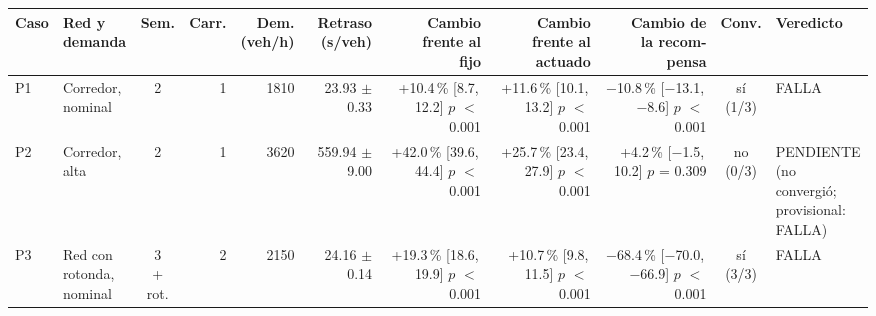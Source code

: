 \begin{table}[H]
\centering
\scriptsize
\setlength{\tabcolsep}{1.5pt}
\begin{tabular}{llcrrrrrrcl}
\toprule
Caso & \makecell[l]{Red y\\demanda} & Sem. & Carr. & \makecell{Dem.\\(veh/h)} & \makecell{Retraso\\(s/veh)} & \makecell{Cambio\\frente al\\fijo} & \makecell{Cambio\\frente al\\actuado} & \makecell{Cambio de\\la recom-\\pensa} & Conv. & Veredicto \\
\midrule
P1 & \makecell[l]{Corredor,\\{}nominal} & 2 & 1 & 1810 & \makecell[r]{23.93\\{}$\pm$ 0.33} & \makecell[r]{+10.4\,\%\\{}[8.7,\,12.2]\\$p$ $<$\,0.001} & \makecell[r]{+11.6\,\%\\{}[10.1,\,13.2]\\$p$ $<$\,0.001} & \makecell[r]{$-$10.8\,\%\\{}[$-$13.1,\,$-$8.6]\\$p$ $<$\,0.001} & \makecell[c]{sí\\{}(1/3)} & FALLA \\
P2 & \makecell[l]{Corredor,\\{}alta} & 2 & 1 & 3620 & \makecell[r]{559.94\\{}$\pm$ 9.00} & \makecell[r]{+42.0\,\%\\{}[39.6,\,44.4]\\$p$ $<$\,0.001} & \makecell[r]{+25.7\,\%\\{}[23.4,\,27.9]\\$p$ $<$\,0.001} & \makecell[r]{+4.2\,\%\\{}[$-$1.5,\,10.2]\\$p$ = 0.309} & \makecell[c]{no\\{}(0/3)} & \makecell[l]{PENDIENTE\\{}(no convergió;\\{}provisional:\\{}FALLA)} \\
P3 & \makecell[l]{Red con\\{}rotonda,\\{}nominal} & \makecell[c]{3\\{}+ rot.} & 2 & 2150 & \makecell[r]{24.16\\{}$\pm$ 0.14} & \makecell[r]{+19.3\,\%\\{}[18.6,\,19.9]\\$p$ $<$\,0.001} & \makecell[r]{+10.7\,\%\\{}[9.8,\,11.5]\\$p$ $<$\,0.001} & \makecell[r]{$-$68.4\,\%\\{}[$-$70.0,\,$-$66.9]\\$p$ $<$\,0.001} & \makecell[c]{sí\\{}(3/3)} & FALLA \\

\end{tabular}
\end{table}
